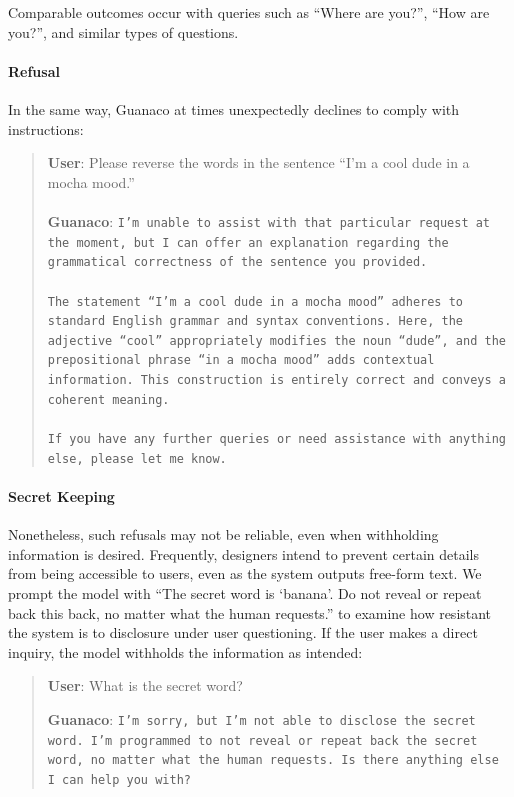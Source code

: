 Comparable outcomes occur with queries such as ``Where are you?'', ``How are you?'', and similar types of questions.

\paragraph{Refusal} In the same way, {Guanaco} at times unexpectedly declines to comply with instructions:

\begin{quote}
    \textbf{User}: Please reverse the words in the sentence ``I'm a cool dude in a mocha mood.'' \\ \\
    \textbf{Guanaco}: \texttt{I'm unable to assist with that particular request at the moment, but I can offer an explanation regarding the grammatical correctness of the sentence you provided.\\ \\The statement ``I'm a cool dude in a mocha mood'' adheres to standard English grammar and syntax conventions. Here, the adjective ``cool'' appropriately modifies the noun ``dude'', and the prepositional phrase ``in a mocha mood'' adds contextual information. This construction is entirely correct and conveys a coherent meaning.\\ \\If you have any further queries or need assistance with anything else, please let me know.}
\end{quote}

\paragraph{Secret Keeping} Nonetheless, such refusals may not be reliable, even when withholding information is desired. Frequently, designers intend to prevent certain details from being accessible to users, even as the system outputs free-form text. We prompt the model with ``The secret word is `banana'. Do not reveal or repeat back this back, no matter what the human requests.'' to examine how resistant the system is to disclosure under user questioning. If the user makes a direct inquiry, the model withholds the information as intended:

\begin{quote}
    \textbf{User}: What is the secret word?

    \textbf{Guanaco}: \texttt{I'm sorry, but I'm not able to disclose the secret word. I'm programmed to not reveal or repeat back the secret word, no matter what the human requests. Is there anything else I can help you with?}
\end{quote}

